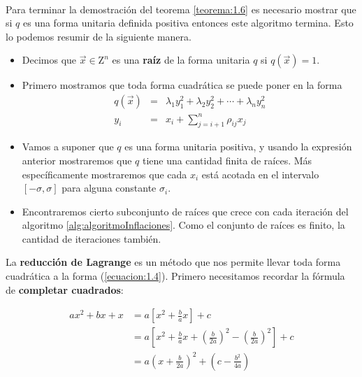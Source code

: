 \paragraph{}
Para terminar la demostración del teorema \ref{teorema:1.6} es necesario mostrar que si $q$ es una forma unitaria definida positiva entonces este algoritmo termina. Esto lo podemos resumir de la siguiente manera.\\
\begin{itemize}
    \item Decimos que $\overrightarrow{x} \in \mathrm{Z}^{n}$ es una \textbf{raíz} de la forma unitaria $q$ si $q(\overrightarrow{x}) = 1$.
    \item Primero mostramos que toda forma cuadrática se puede poner en la forma
    \begin{eqnarray*}
 q({\overrightarrow{x}}) &  =  & \lambda_{1}y_{1}^{2} + \lambda_{2}y_{2}^{2} + \cdots + \lambda_{n}y_{n}^{2} \\
 y_{i} &  =  & x_{i}+ \sum_{j=i+1}^{n}\rho_{ij}x_{j}
    \end{eqnarray*}
    \item Vamos a suponer que $q$ es una forma unitaria positiva, y usando la expresión anterior mostraremos que $q$ tiene una cantidad finita de raíces. Más específicamente mostraremos que cada $x_{i}$ está acotada en el intervalo $\left[-\sigma, \sigma\right]$ para alguna constante $\sigma_{i}$.
    \item Encontraremos cierto subconjunto de raíces que crece con cada iteración del algoritmo \ref{alg:algoritmoInflaciones}. Como el conjunto de raíces es finito, la cantidad de iteraciones también.
\end{itemize}

La \textbf{reducción de Lagrange} es un método que nos permite llevar toda forma cuadrática a la forma (\ref{ecuacion:1.4}). Primero necesitamos recordar la fórmula de \textbf{completar cuadrados}:

\begin{equation}
\begin{split}
ax^{2} + bx + x & = a\left[x^{2} + \frac{b}{a}x \right] + c\\
 & = a\left[x^{2} + \frac{b}{a}x + \left(\frac{b}{2a}\right)^{2} - \left(\frac{b}{2a}\right)^{2} \right] + c\\
 & = a\left(x + \frac{b}{2a}\right)^{2} + \left(c - \frac{b^{2}}{4a} \right)
\end{split}
\label{ecuacion:2.2}
\end{equation}

